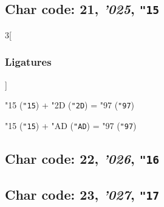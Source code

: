 \documentclass{article}
\newlength{\maxcharwidth}
\begin{document}

\subsection{Char code: 21, {\it'025}, {\tt"15}}
\label{char_21}


\begin{multicols}{3}[\subsubsection{Ligatures}]

{\testfont\char"15\noboundary} ({\tt"15}) + {\testfont\char"2D\noboundary} ({\tt"2D}) = {\testfont\char"97\noboundary} ({\tt"97}) 

{\testfont\char"15\noboundary} ({\tt"15}) + {\testfont\char"AD\noboundary} ({\tt"AD}) = {\testfont\char"97\noboundary} ({\tt"97}) 

\end{multicols}

\subsection{Char code: 22, {\it'026}, {\tt"16}}
\label{char_22}


\subsection{Char code: 23, {\it'027}, {\tt"17}}
\label{char_23}
\end{document}
